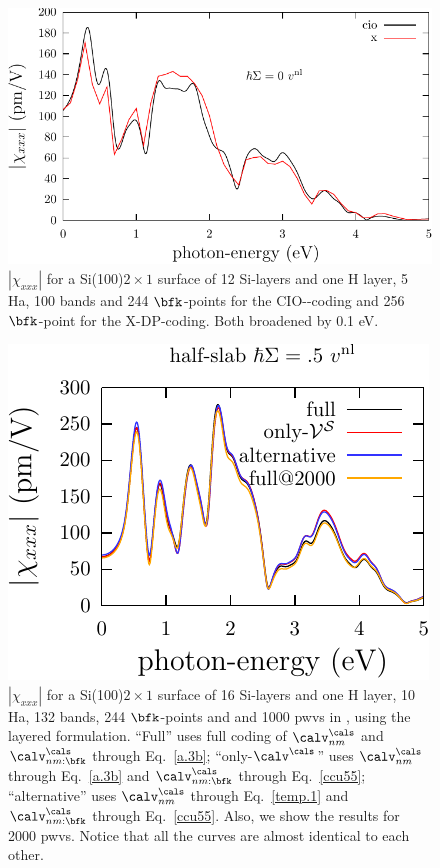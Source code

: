 \begin{figure}[b]
\centering
\includegraphics[scale=.7]{figures/plots/shg-si-2x1-n-vs-b}
\caption{$|\chi_{xxx}|$ 
for a Si(100)$2\times 1$ surface of 12 Si-layers and one H layer, 5
Ha, 100 bands and 244 $\bfk$-points for the CIO-\tiniba-coding
and 256 $\bfk$-point for the X-DP\copyr-coding.
Both broadened by 0.1 eV.   
}
\label{si-2x1-n-vs-b}
\end{figure}
\begin{figure}[b]
\centering 
\includegraphics[scale=1.5]{figures/plots/shg-si-2x1-16-compa}
\caption{$|\chi_{xxx}|$ 
for a Si(100)$2\times 1$ surface of 16 Si-layers and one H layer, 10 
Ha, 132 bands, 244 $\bfk$-points and and 1000 pwvs in \depe, using 
the layered formulation. 
``Full'' uses full coding of 
$\calv^\cals_{nm}$ and 
$\calv^\cals_{nm:\bfk}$ through Eq.~\eqref{a.3b};
``only-$\calv^\cals$'' uses 
$\calv^\cals_{nm}$ through Eq.~\eqref{a.3b} and 
$\calv^\cals_{nm:\bfk}$ through Eq.~\eqref{ccu55};
``alternative'' uses $\calv^\cals_{nm}$ through Eq.~\eqref{temp.1} and 
$\calv^\cals_{nm:\bfk}$ through Eq.~\eqref{ccu55}.
Also, we show the results for 2000 pwvs.
Notice that all the curves are almost identical to each other. 
}
\label{si-2x1-compa}
\end{figure}

